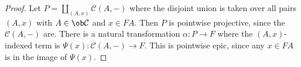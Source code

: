\begin{proof}
    Let \( P = \coprod_{(A, x)} \mathcal C(A, -) \) where the disjoint union is taken over all pairs \( (A, x) \) with \( A \in \ob \mathcal C \) and \( x \in FA \).
    Then \( P \) is pointwise projective, since the \( \mathcal C(A, -) \) are.
    There is a natural transformation \( \alpha : P \to F \) where the \( (A, x) \)-indexed term is \( \Psi(x) : \mathcal C(A, -) \to F \).
    This is pointwise epic, since any \( x \in FA \) is in the image of \( \Psi(x) \).
\end{proof}
